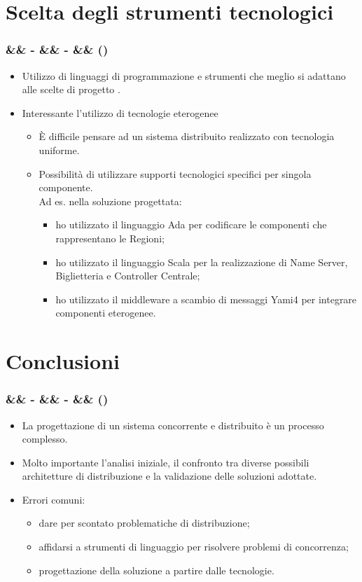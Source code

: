 \documentclass[slidestop,compress,blackandwhite]{beamer}
\newcommand{\cm}[1]{\vspace{#1cm}}
\newcommand{\newtitle}[4]{
	#1 
	\ifx&#2&%
	\else
  		\large- #2
	\fi
	\ifx&#3&%
	\else
  		\small- #3
	\fi
	\ifx&#4&%
	\else
  		\normalsize (#4)
	\fi
}
\newcommand{\newframe}[5]{
	\begin{frame}
		\frametitle{\newtitle{#1}{#2}{#3}{#4}}
		#5
	\end{frame}
}
\newcommand{\myitemize}[1]{
	\begin{itemize}\itemsep4pt
	#1
	\end{itemize}
}
\begin{document}
\section{Scelta degli strumenti tecnologici}\label{tec}
	
	\newframe{}{}{}{}{
		\myitemize {
			\item Utilizzo di linguaggi di programmazione e strumenti che meglio si adattano alle scelte di progetto .
			\item Interessante l'utilizzo di tecnologie eterogenee
				\myitemize {
					\item \`E difficile pensare ad un sistema distribuito realizzato con tecnologia uniforme.
					\item Possibilità di utilizzare supporti tecnologici specifici per singola componente.\\Ad es. nella soluzione progettata:
						\myitemize {
							\item ho utilizzato il linguaggio Ada per codificare le componenti che rappresentano le Regioni;
							\item ho utilizzato il linguaggio Scala per la realizzazione di Name Server, Biglietteria e Controller Centrale;
							\item ho utilizzato il middleware a scambio di messaggi Yami4 per integrare componenti eterogenee. 
						}
				}
		}
	}
\section{Conclusioni}\label{conclusions}
	
	\newframe{}{}{}{}{
		\cm{0.5}
		\myitemize {
			\item La progettazione di un sistema concorrente e distribuito è un processo complesso.
			\item Molto importante l'analisi iniziale, il confronto tra diverse possibili architetture di distribuzione e la validazione delle soluzioni adottate.
			\item Errori comuni:
				\myitemize {
					\item dare per scontato problematiche di distribuzione;
					\item affidarsi a strumenti di linguaggio per risolvere problemi di concorrenza;
					\item progettazione della soluzione a partire dalle tecnologie.
				}
		}
	}
	
\end{document}
